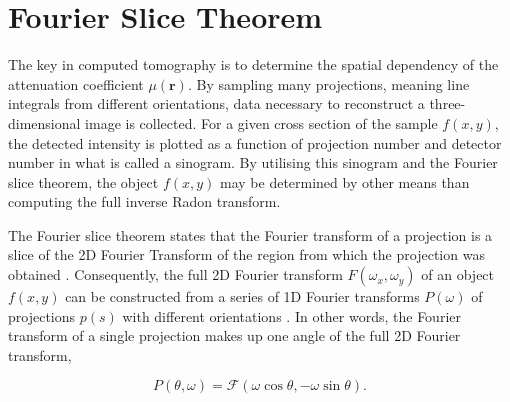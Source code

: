 
\section{Fourier Slice Theorem}
The key in computed tomography is to determine the spatial dependency of the attenuation coefficient $\mu(\bm{r})$.
By sampling many projections, meaning line integrals from different orientations, data necessary to reconstruct a three-dimensional image is collected.
For a given cross section of the sample $f(x, y)$, the detected intensity is plotted as a function of projection number and detector number in what is called a sinogram.
By utilising this sinogram and the Fourier slice theorem, the object $f(x, y)$ may be determined by other means than computing the full inverse Radon transform.

The Fourier slice theorem states that the Fourier transform of a projection
is a slice of the 2D Fourier Transform of the region from which the projection was obtained \cite{gonzalez2018digital}.
Consequently, the full 2D Fourier transform
$F(\omega_x, \omega_y)$ of an object $f(x,y)$ can be constructed from a series of 1D Fourier transforms
$P(\omega)$ of projections $p(s)$ with different orientations \cite{zeng2010medical}.
In other words, the Fourier transform of a single projection makes up one angle of the full 2D Fourier transform,

\begin{equation}\label{eq:Fourier_slice}
    P(\theta, \omega) = \mathcal{F} \left( \omega \cos \theta, -\omega \sin \theta \right). %
\end{equation}




